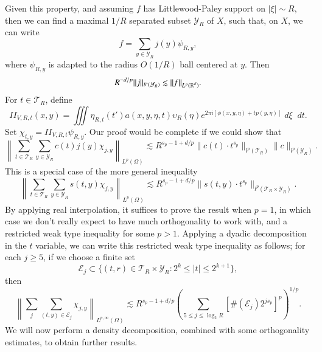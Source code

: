 Given this property, and assuming $f$ has Littlewood-Paley support on $|\xi| \sim R$, then we can find a maximal $1/R$ separated subset $\mathcal{Y}_R$ of $X$, such that, on $X$, we can write
%
\[ f = \sum_{y \in \mathcal{Y}_R} j(y) \psi_{R,y}, \]
%
where $\psi_{R,y}$ is adapted to the radius $O(1/R)$ ball centered at $y$. Then
%
\[ R^{-d/p} \| j \|_{l^p(\mathcal{Y}_R)} \lesssim \| f \|_{L^p(\operatorname{\mathbb{R}}^d)}. \]
%
For $t \in \mathcal{T}_R$, define
%
\[ II_{V,R,t}(x,y) = \iiint \eta_{R,t}(t') a(x,y,\eta,t) \upsilon_R(\eta) e^{2 \pi i [\phi(x,y,\eta) + t p(y,\eta)]}\; d\xi\;\; dt. \]
Set $\chi_{t,y} = II_{V,R,t} \psi_{R,y}$. Our proof would be complete if we could show that
%
\[ \left\| \sum_{t \in \mathcal{T}_R} \sum_{y \in \mathcal{Y}_R} c(t) j(y) \chi_{j,y} \right\|_{L^p(\Omega)} \lesssim R^{s_p - 1 + d/p} \| c(t) \cdot t^{s_p} \|_{l^p(\mathcal{T}_R)} \| c \|_{l^p(\mathcal{Y}_R)}. \]
%
This is a special case of the more general inequality
%
\[ \left\| \sum_{t \in \mathcal{T}_R} \sum_{y \in \mathcal{Y}_R} s(t,y) \chi_{j,y} \right\|_{L^p(\Omega)} \lesssim R^{s_p - 1 + d/p} \| s(t,y) \cdot t^{s_p}  \|_{l^p(\mathcal{T}_R \times \mathcal{Y}_R)}. \]
%
By applying real interpolation, it suffices to prove the result when $p = 1$, in which case we don't really expect to have much orthogonality to work with, and a restricted weak type inequality for some $p > 1$. Applying a dyadic decomposition in the $t$ variable, we can write this restricted weak type inequality as follows; for each $j \geq 5$, if we choose a finite set
%
\[ \mathcal{E}_j \subset \{ (t,r) \in \mathcal{T}_R \times \mathcal{Y}_R: 2^k \leq |t| \leq 2^{k+1} \}, \]
%
then
%
\[ \left\| \sum_j \sum_{(t,y) \in \mathcal{E}_j} \chi_{j,y} \right\|_{L^{p,\infty}(\Omega)} \lesssim R^{s_p - 1 + d/p} \left( \sum_{5 \leq j \leq \log_2 R} [ \#(\mathcal{E}_j) 2^{js_p} ]^p \right)^{1/p}. \]
%
We will now perform a density decomposition, combined with some orthogonality estimates, to obtain further results.

